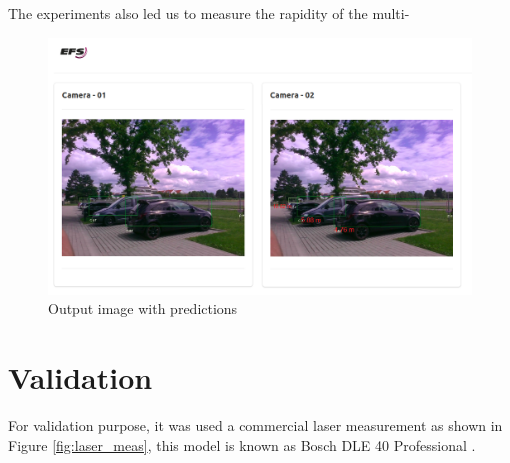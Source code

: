 The experiments also led us to measure the rapidity of the multi-%

\begin{figure}[H]
\centering
\includegraphics[scale=0.8]{imagens/output_framework.png}
\caption{Output image with predictions }
\label{fig:framework_predict}
\end{figure}



\section{Validation}

For validation purpose, it was used a commercial laser measurement as shown in Figure \ref{fig:laser_meas}, this model is known as Bosch DLE 40 Professional {\tiny{\textregistered}}. 



